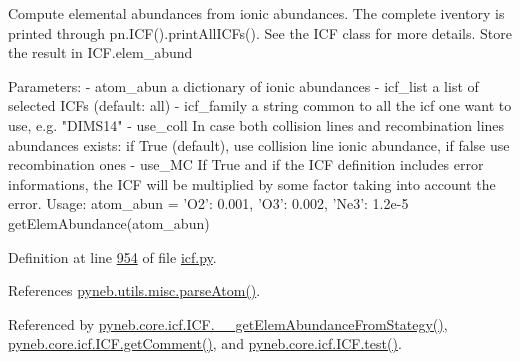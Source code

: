 \begin{DoxyVerb}Compute elemental abundances from ionic abundances. The complete iventory is printed through pn.ICF().printAllICFs().
See the ICF class for more details.
Store the result in ICF.elem_abund

Parameters: 
   - atom_abun    a dictionary of ionic abundances
   - icf_list     a list of selected ICFs (default: all)
   - icf_family   a string common to all the icf one want to use, e.g. "DIMS14"
   - use_coll     In case both collision lines and recombination lines abundances exists:
           if True (default), use collision line ionic abundance, if false use recombination ones
   - use_MC       If True and if the ICF definition includes error informations, the ICF will be multiplied
           by some factor taking into account the error.
Usage:
    atom_abun = {'O2': 0.001, 'O3': 0.002, 'Ne3': 1.2e-5}
    getElemAbundance(atom_abun)\end{DoxyVerb}
 

Definition at line \hyperlink{icf_8py_source_l00954}{954} of file \hyperlink{icf_8py_source}{icf.\-py}.



References \hyperlink{misc_8py_source_l00159}{pyneb.\-utils.\-misc.\-parse\-Atom()}.



Referenced by \hyperlink{icf_8py_source_l01075}{pyneb.\-core.\-icf.\-I\-C\-F.\-\_\-\-\_\-get\-Elem\-Abundance\-From\-Stategy()}, \hyperlink{icf_8py_source_l00943}{pyneb.\-core.\-icf.\-I\-C\-F.\-get\-Comment()}, and \hyperlink{icf_8py_source_l01114}{pyneb.\-core.\-icf.\-I\-C\-F.\-test()}.


